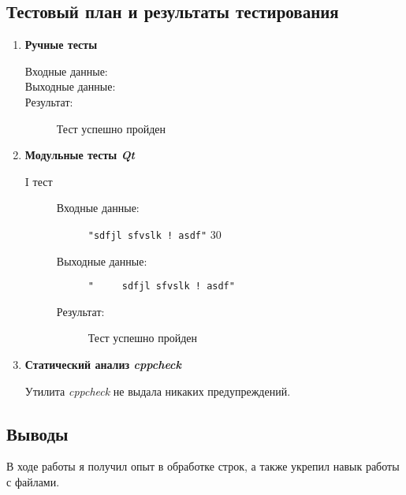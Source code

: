 \documentclass[12pt,a4paper]{report}
\begin{document}
\subsection{Тестовый план и результаты тестирования}
\hspace{\parindent}
\begin{enumerate}
\item \textbf{Ручные тесты}
\begin{flushleft}
\begin{description}

\item[Входные данные:] 

\item[Выходные данные:] 

\item[Результат:] Тест успешно пройден

\end{description}
\end{flushleft}
\item \textbf{Модульные тесты \textit{Qt}}

\begin{description}
\item[I тест]
\hspace{\parindent}
\begin{flushleft}
\begin{description}
\item[Входные данные:] \verb-"sdfjl sfvslk ! asdf"- 30


\item[Выходные данные:] \verb-"     sdfjl sfvslk ! asdf"-

\item[Результат:] Тест успешно пройден
\end{description}
\end{flushleft}
\end{description}

\item \textbf{Статический анализ \textit{cppcheck}}

Утилита \textit{cppcheck} не выдала никаких предупреждений.
\end{enumerate}
\subsection{Выводы}
\hspace{\parindent}
В ходе работы я получил опыт в обработке строк, а также укрепил навык работы с файлами.
\end{document}
